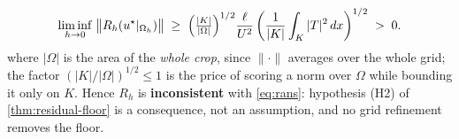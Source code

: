 \begin{theorem}
\begin{enumerate}
\begin{equation}
\liminf_{h\to0}\;\bigl\|R_h(u^\star|_{\Omega_h})\bigr\|
\;\ge\;\Bigl(\tfrac{|K|}{|\Omega|}\Bigr)^{1/2}\frac{\ell}{U^2}
\left(\frac{1}{|K|}\int_K |T|^2\,dx\right)^{1/2}\;>\;0 .
\label{eq:floor-limit}
\end{equation}
where $|\Omega|$ is the area of the \emph{whole crop}, since $\|\cdot\|$ averages over the
whole grid; the factor $(|K|/|\Omega|)^{1/2}\le1$ is the price of scoring a norm over
$\Omega$ while bounding it only on $K$.
Hence $R_h$ is \textbf{inconsistent} with \eqref{eq:rans}: hypothesis \textup{(H2)} of
\autoref{thm:residual-floor} is a consequence, not an assumption, and no grid refinement
removes the floor.
\end{enumerate}
\end{theorem}

